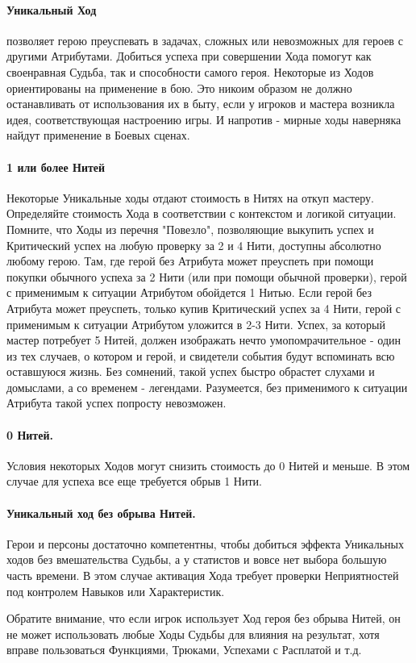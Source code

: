 \paragraph{Уникальный Ход} позволяет герою преуспевать в задачах, сложных или невозможных для героев с другими Атрибутами. Добиться успеха при совершении Хода помогут как своенравная Судьба, так и способности самого героя. 
\newline Некоторые из Ходов ориентированы на применение в бою. Это никоим образом не должно останавливать от использования их в быту, если у игроков и мастера возникла идея, соответствующая настроению игры. И напротив - мирные ходы наверняка найдут применение в Боевых сценах.
\paragraph{1 или более Нитей} Некоторые Уникальные ходы отдают стоимость в Нитях на откуп мастеру. Определяйте стоимость Хода в соответствии с контекстом и логикой ситуации. Помните, что Ходы из перечня "Повезло", позволяющие выкупить успех и Критический успех на любую проверку за 2 и 4 Нити, доступны абсолютно любому герою. Там, где герой без Атрибута может преуспеть при помощи покупки обычного успеха за 2 Нити (или при помощи обычной проверки), герой с применимым к ситуации Атрибутом обойдется 1 Нитью. Если герой без Атрибута может преуспеть, только купив Критический успех за 4 Нити, герой с применимым к ситуации Атрибутом уложится в 2-3 Нити. Успех, за который мастер потребует 5 Нитей, должен изображать нечто умопомрачительное - один из тех случаев, о котором и герой, и свидетели события будут вспоминать всю оставшуюся жизнь. Без сомнений, такой успех быстро обрастет слухами и домыслами, а со временем - легендами. Разумеется, без применимого к ситуации Атрибута такой успех попросту невозможен.
\paragraph{0 Нитей.} Условия некоторых Ходов могут снизить стоимость до 0 Нитей и меньше. В этом случае для успеха все еще требуется обрыв 1 Нити.
\paragraph{Уникальный ход без обрыва Нитей.} Герои и персоны достаточно компетентны, чтобы добиться эффекта Уникальных ходов без вмешательства Судьбы, а у статистов и вовсе нет выбора большую часть времени. В этом случае активация Хода требует проверки Неприятностей под контролем Навыков или Характеристик. 
\begin{tcolorbox}
    Обратите внимание, что если игрок использует Ход героя без обрыва Нитей, он не может использовать любые Ходы Судьбы для влияния на результат, хотя вправе пользоваться Функциями, Трюками, Успехами с Расплатой и т.д.
\end{tcolorbox}
